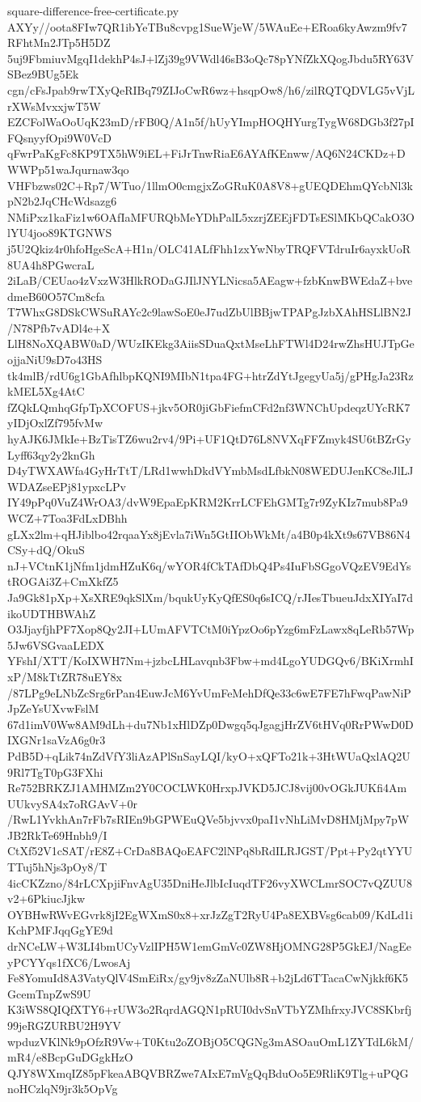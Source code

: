 \documentclass[11pt]{article}
\theoremstyle{definition}
\theoremstyle{remark}
\begin{document}
\begin{filecontents*}[overwrite]{square-difference-free-certificate.py}
AXYy//oota8FIw7QR1ibYeTBu8cvpg1SueWjeW/5WAuEe+ERoa6kyAwzm9fv7RFhtMn2JTp5H5DZ
5uj9FbmiuvMgqI1dekhP4sJ+lZj39g9VWdl46sB3oQc78pYNfZkXQogJbdu5RY63VSBez9BUg5Ek
cgn/cFsJpab9rwTXyQeRIBq79ZIJoCwR6wz+hsqpOw8/h6/zilRQTQDVLG5vVjLrXWsMvxxjwT5W
EZCFolWaOoUqK23mD/rFB0Q/A1n5f/hUyYImpHOQHYurgTygW68DGb3f27pIFQsnyyfOpi9W0VcD
qFwrPaKgFc8KP9TX5hW9iEL+FiJrTnwRiaE6AYAfKEnww/AQ6N24CKDz+DWWPp51waJqurnaw3qo
VHFbzws02C+Rp7/WTuo/1llmO0cmgjxZoGRuK0A8V8+gUEQDEhmQYcbNl3kpN2b2JqCHcWdsazg6
NMiPxz1kaFiz1w6OAfIaMFURQbMeYDhPalL5xzrjZEEjFDTsESlMKbQCakO3OlYU4joo89KTGNWS
j5U2Qkiz4r0hfoHgeScA+H1n/OLC41ALfFhh1zxYwNbyTRQFVTdruIr6ayxkUoR8UA4h8PGwcraL
2iLaB/CEUao4zVxzW3HlkRODaGJIlJNYLNicsa5AEagw+fzbKnwBWEdaZ+bvedmeB60O57Cm8cfa
T7WhxG8DSkCWSuRAYc2c9lawSoE0eJ7udZbUlBBjwTPAPgJzbXAhHSLlBN2J/N78Pfb7vADl4e+X
LlH8NoXQABW0aD/WUzIKEkg3AiisSDuaQxtMseLhFTWl4D24rwZhsHUJTpGeojjaNiU9sD7o43HS
tk4mlB/rdU6g1GbAfhlbpKQNI9MIbN1tpa4FG+htrZdYtJgegyUa5j/gPHgJa23RzkMEL5Xg4AtC
fZQkLQmhqGfpTpXCOFUS+jkv5OR0jiGbFiefmCFd2nf3WNChUpdeqzUYcRK7yIDjOxlZf795fvMw
hyAJK6JMkIe+BzTisTZ6wu2rv4/9Pi+UF1QtD76L8NVXqFFZmyk4SU6tBZrGyLyff63qy2y2knGh
D4yTWXAWfa4GyHrTtT/LRd1wwhDkdVYmbMsdLfbkN08WEDUJenKC8eJlLJWDAZseEPj81ypxcLPv
IY49pPq0VuZ4WrOA3/dvW9EpaEpKRM2KrrLCFEhGMTg7r9ZyKIz7mub8Pa9WCZ+7Toa3FdLxDBhh
gLXx2lm+qHJiblbo42rqaaYx8jEvla7iWn5GtIIObWkMt/a4B0p4kXt9s67VB86N4CSy+dQ/OkuS
nJ+VCtnK1jNfm1jdmHZuK6q/wYOR4fCkTAfDbQ4Ps4IuFbSGgoVQzEV9EdYstROGAi3Z+CmXkfZ5
Ja9Gk81pXp+XsXRE9qkSlXm/bqukUyKyQfES0q6sICQ/rJIesTbueuJdxXIYaI7dikoUDTHBWAhZ
O3JjayfjhPF7Xop8Qy2JI+LUmAFVTCtM0iYpzOo6pYzg6mFzLawx8qLeRb57Wp5Jw6VSGvaaLEDX
YFshI/XTT/KoIXWH7Nm+jzbcLHLavqnb3Fbw+md4LgoYUDGQv6/BKiXrmhIxP/M8kTtZR78uEY8x
/87LPg9eLNbZcSrg6rPan4EuwJcM6YvUmFeMehDfQe33c6wE7FE7hFwqPawNiPJpZeYsUXvwFslM
67d1imV0Ww8AM9dLh+du7Nb1xHlDZp0Dwgq5qJgagjHrZV6tHVq0RrPWwD0DIXGNr1saVzA6g0r3
PdB5D+qLik74nZdVfY3liAzAPlSnSayLQI/kyO+xQFTo21k+3HtWUaQxlAQ2U9Rl7TgT0pG3FXhi
Re752BRKZJ1AMHMZm2Y0COCLWK0HrxpJVKD5JCJ8vij00vOGkJUKfi4AmUUkvySA4x7oRGAvV+0r
/RwL1YvkhAn7rFb7sRIEn9bGPWEuQVe5bjvvx0paI1vNhLiMvD8HMjMpy7pWJB2RkTe69Hnbh9/I
CtXf52V1cSAT/rE8Z+CrDa8BAQoEAFC2lNPq8bRdILRJGST/Ppt+Py2qtYYUTTuj5hNjs3pOy8/T
4icCKZzno/84rLCXpjiFnvAgU35DniHeJlbIcIuqdTF26vyXWCLmrSOC7vQZUU8v2+6PkiucJjkw
OYBHwRWvEGvrk8jI2EgWXmS0x8+xrJzZgT2RyU4Pa8EXBVsg6cab09/KdLd1iKchPMFJqqGgYE9d
drNCeLW+W3LI4bmUCyVzlIPH5W1emGmVc0ZW8HjOMNG28P5GkEJ/NagEeyPCYYqs1fXC6/LwosAj
Fe8YomuId8A3VatyQlV4SmEiRx/gy9jv8zZaNUlb8R+b2jLd6TTacaCwNjkkf6K5GcemTnpZwS9U
K3iWS8QIQfXTY6+rUW3o2RqrdAGQN1pRUI0dvSnVTbYZMhfrxyJVC8SKbrfj99jeRGZURBU2H9YV
wpduzVKlNk9pOfzR9Vw+T0Ktu2oZOBjO5CQGNg3mASOauOmL1ZYTdL6kM/mR4/e8BcpGuDGgkHzO
QJY8WXmqIZ85pFkeaABQVBRZwe7AIxE7mVgQqBduOo5E9RliK9Tlg+uPQGnoHCzlqN9jr3k5OpVg

\end{filecontents*}
\end{document}
